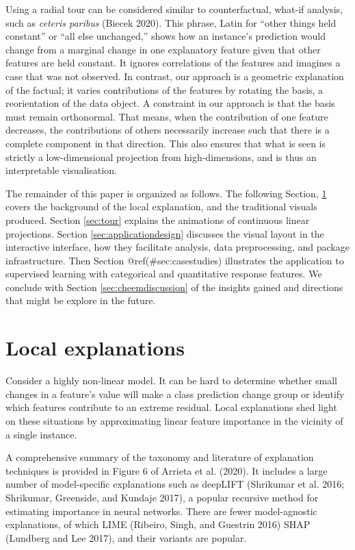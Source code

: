 \documentclass[
]{article}
\begin{document}
Using a radial tour can be considered similar to counterfactual, what-if analysis, such as \emph{ceteris paribus} (Biecek 2020). This phrase, Latin for ``other things held constant'' or ``all else unchanged,'' shows how an instance's prediction would change from a marginal change in one explanatory feature given that other features are held constant. It ignores correlations of the features and imagines a case that was not observed. In contrast, our approach is a geometric explanation of the factual; it varies contributions of the features by rotating the basis, a reorientation of the data object. A constraint in our approach is that the basis must remain orthonormal. That means, when the contribution of one feature decreases, the contributions of others necessarily increase such that there is a complete component in that direction. This also ensures that what is seen is strictly a low-dimensional projection from high-dimensions, and is thus an interpretable visualisation.

The remainder of this paper is organized as follows. The following Section, \ref{sec:explanations} covers the background of the local explanation, and the traditional visuals produced. Section \ref{sec:tour} explains the animations of continuous linear projections. Section \ref{sec:applicationdesign} discusses the visual layout in the interactive interface, how they facilitate analysis, data preprocessing, and package infrastructure. Then Section @ref(\#sec:casestudies) illustrates the application to supervised learning with categorical and quantitative response features. We conclude with Section \ref{sec:cheemdiscussion} of the insights gained and directions that might be explore in the future.

\hypertarget{sec:explanations}{%
\section{Local explanations}\label{sec:explanations}}

Consider a highly non-linear model. It can be hard to determine whether small changes in a feature's value will make a class prediction change group or identify which features contribute to an extreme residual. Local explanations shed light on these situations by approximating linear feature importance in the vicinity of a single instance.

A comprehensive summary of the taxonomy and literature of explanation techniques is provided in Figure 6 of Arrieta et al. (2020). It includes a large number of model-specific explanations such as deepLIFT (Shrikumar et al. 2016; Shrikumar, Greenside, and Kundaje 2017), a popular recursive method for estimating importance in neural networks. There are fewer model-agnostic explanations, of which LIME (Ribeiro, Singh, and Guestrin 2016) SHAP (Lundberg and Lee 2017), and their variants are popular.
\end{document}
